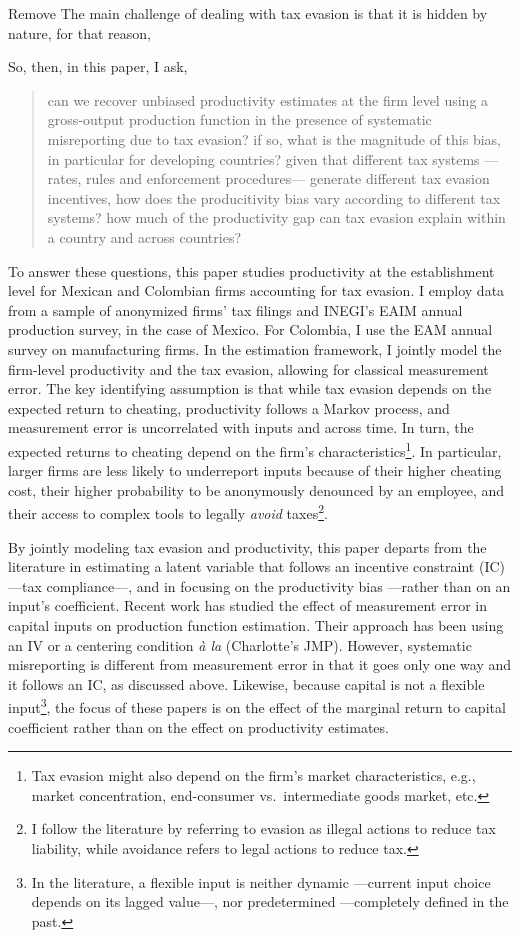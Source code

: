 \documentclass[
  12pt]{article}
\begin{document}
\begin{anfxnote}{Remove}
The main challenge of dealing with tax evasion is that it is hidden by
nature, for that reason,

So, then, in this paper, I ask,

\begin{quote}
can we recover unbiased productivity estimates at the firm level using a
gross-output production function in the presence of systematic
misreporting due to tax evasion? if so, what is the magnitude of this
bias, in particular for developing countries? given that different tax
systems ---rates, rules and enforcement procedures--- generate different
tax evasion incentives, how does the producitivity bias vary according
to different tax systems? how much of the productivity gap can tax
evasion explain within a country and across countries?
\end{quote}

To answer these questions, this paper studies productivity at the
establishment level for Mexican and Colombian firms accounting for tax
evasion. I employ data from a sample of anonymized firms' tax filings
and INEGI's EAIM annual production survey, in the case of Mexico. For
Colombia, I use the EAM annual survey on manufacturing firms. In the
estimation framework, I jointly model the firm-level productivity and
the tax evasion, allowing for classical measurement error. The key
identifying assumption is that while tax evasion depends on the expected
return to cheating, productivity follows a Markov process, and
measurement error is uncorrelated with inputs and across time. In turn,
the expected returns to cheating depend on the firm's
characteristics\footnote{Tax evasion might also depend on the firm's
  market characteristics, e.g., market concentration, end-consumer
  vs.~intermediate goods market, etc.}. In particular, larger firms are
less likely to underreport inputs because of their higher cheating cost,
their higher probability to be anonymously denounced by an employee, and
their access to complex tools to legally \emph{avoid} taxes\footnote{I
  follow the literature by referring to evasion as illegal actions to
  reduce tax liability, while avoidance refers to legal actions to
  reduce tax.}.

By jointly modeling tax evasion and productivity, this paper departs
from the literature in estimating a latent variable that follows an
incentive constraint (IC) ---tax compliance---, and in focusing on the
productivity bias ---rather than on an input's coefficient. Recent work
has studied the effect of measurement error in capital inputs on
production function estimation. Their approach has been using an IV
\citep{Collard2020} or a centering condition \emph{à la} \citet{Hu2008}
(Charlotte's JMP). However, systematic misreporting is different from
measurement error in that it goes only one way and it follows an IC, as
discussed above. Likewise, because capital is not a flexible
input\footnote{In the literature, a flexible input is neither dynamic
  ---current input choice depends on its lagged value---, nor
  predetermined ---completely defined in the past.}, the focus of these
papers is on the effect of the marginal return to capital coefficient
rather than on the effect on productivity estimates.


\end{anfxnote}
\end{document}
